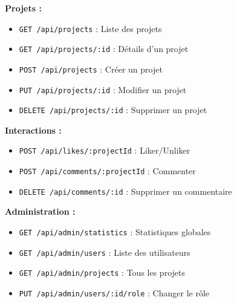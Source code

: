 \documentclass[12pt,a4paper]{article}
\begin{document}
\textbf{Projets :}
\begin{itemize}[leftmargin=*]
    \item \texttt{GET /api/projects} : Liste des projets
    \item \texttt{GET /api/projects/:id} : Détails d'un projet
    \item \texttt{POST /api/projects} : Créer un projet
    \item \texttt{PUT /api/projects/:id} : Modifier un projet
    \item \texttt{DELETE /api/projects/:id} : Supprimer un projet
\end{itemize}

\textbf{Interactions :}
\begin{itemize}[leftmargin=*]
    \item \texttt{POST /api/likes/:projectId} : Liker/Unliker
    \item \texttt{POST /api/comments/:projectId} : Commenter
    \item \texttt{DELETE /api/comments/:id} : Supprimer un commentaire
\end{itemize}

\textbf{Administration :}
\begin{itemize}[leftmargin=*]
    \item \texttt{GET /api/admin/statistics} : Statistiques globales
    \item \texttt{GET /api/admin/users} : Liste des utilisateurs
    \item \texttt{GET /api/admin/projects} : Tous les projets
    \item \texttt{PUT /api/admin/users/:id/role} : Changer le rôle
\end{itemize}
\end{document}
